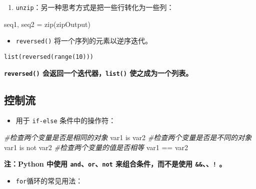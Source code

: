 \documentclass[]{ctexart}
\newenvironment{Shaded}{}{}
\newcommand{\CommentTok}[1]{\textcolor[rgb]{0.38,0.63,0.69}{\textit{{#1}}}}
\newcommand{\OperatorTok}[1]{\textcolor[rgb]{0.40,0.40,0.40}{{#1}}}
\newcommand{\BuiltInTok}[1]{{#1}}
\newcommand{\NormalTok}[1]{{#1}}
\begin{document}
\begin{enumerate}
\def\labelenumi{\arabic{enumi}.}
\item
  \texttt{unzip}：另一种思考方式是把一些行转化为一些列：
\end{enumerate}

\begin{Shaded}
\begin{Highlighting}[]
\NormalTok{seq1, seq2 }\OperatorTok{=} \BuiltInTok{zip}\NormalTok{(zipOutput)}
\end{Highlighting}
\end{Shaded}

\begin{itemize}
\item
  \texttt{reversed()} 将一个序列的元素以逆序迭代。
\end{itemize}

\begin{verbatim}
list(reversed(range(10))) 
\end{verbatim}

\textbf{\texttt{reversed()} 会返回一个迭代器，\texttt{list()}
使之成为一个列表。}

\hypertarget{header-n302}{\subsection{控制流}\label{header-n302}}

\begin{itemize}
\item
  用于 \texttt{if-else} 条件中的操作符：
\end{itemize}

\begin{Shaded}
\begin{Highlighting}[]
\CommentTok{#检查两个变量是否是相同的对象}
\NormalTok{var1 }\OperatorTok{is} \NormalTok{var2}
\CommentTok{#检查两个变量是否是不同的对象}
\NormalTok{var1 }\OperatorTok{is} \OperatorTok{not} \NormalTok{var2}
\CommentTok{#检查两个变量的值是否相等}
\NormalTok{var1 }\OperatorTok{==} \NormalTok{var2}
\end{Highlighting}
\end{Shaded}

\textbf{注：Python 中使用 \texttt{and}、\texttt{or}、\texttt{not}
来组合条件，而不是使用
\texttt{\&\&}、\texttt{\textbar{}\textbar{}}、\texttt{!} 。}

\begin{itemize}
\item
  \texttt{for}循环的常见用法：
\end{itemize}
\end{document}
